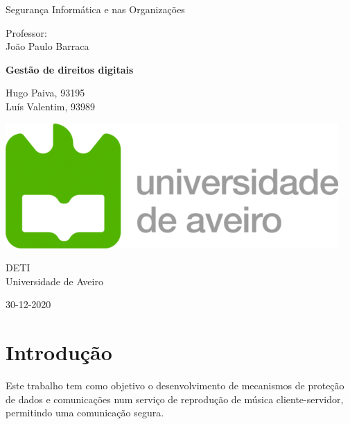 \documentclass[10pt,english]{article}
\begin{document}
\begin{titlepage}
	\clearpage\thispagestyle{empty}
	\centering
	\vspace{2cm}

	
	{\Large  Segurança Informática e nas Organizações \par}
	\vspace{0.5cm}
	{\small Professor: \\
	João Paulo Barraca\par}
	\vspace{4cm}
	{\Huge \textbf{Gestão de direitos digitais}} \\
	\vspace{1cm}
	\vspace{4cm}
	{\normalsize Hugo Paiva, 93195 \\ 
	             Luís Valentim, 93989
	   \par}
	\vspace{2cm}

    \includegraphics[scale=0.20]{logo_ua.png}
    
    \vspace{2cm}
    
	{\normalsize DETI \\ 
		Universidade de Aveiro \par}
		
	{\normalsize 30-12-2020 \par}
	\vspace{2cm}
		
	
	\pagebreak

\end{titlepage}
\tableofcontents{}
\clearpage

\section{Introdução}
\par Este trabalho tem como objetivo o desenvolvimento de mecanismos de proteção de dados e comunicações num serviço de reprodução de música cliente-servidor, permitindo uma comunicação segura. 
\end{document}
